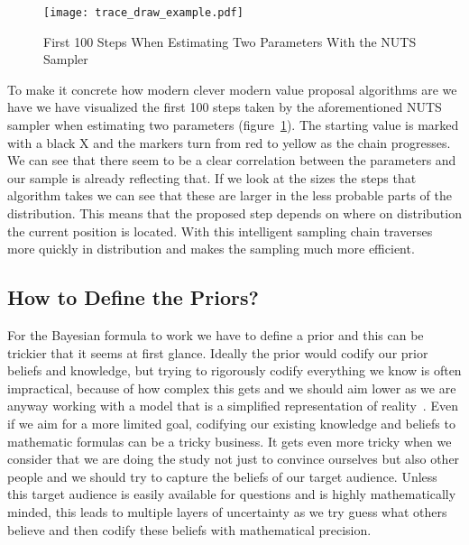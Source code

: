 \documentclass[12pt,a4paper,leqno]{report}
\theoremstyle{plain}
\theoremstyle{definition}
\theoremstyle{remark}
\begin{document}
\begin{figure}[H]
    \centering
    \caption{First 100 Steps When Estimating Two Parameters With the NUTS Sampler}\label{traceexample}
    \texttt{[image: trace\_draw\_example.pdf]}
\end{figure}

To make it concrete how modern clever modern value proposal algorithms are we
have we have visualized the first 100 steps taken by the aforementioned NUTS sampler
when estimating two parameters (figure\ \ref{traceexample}). The starting value is
marked with a black X and the markers turn from red to yellow as the chain progresses.
We can see that there seem to be a clear correlation between the parameters and our
sample is already reflecting that. If we look at the sizes the steps that algorithm
takes we can see that these are larger in the less probable parts of the distribution.
This means that the proposed step depends on where on distribution the current position
is located. With this intelligent sampling chain traverses more
quickly in distribution and makes the sampling much more efficient.

\subsection{How to Define the Priors?}\label{bayesproblems}

For the Bayesian formula to work we have to define a prior and this can be
trickier that it seems at first glance. Ideally the prior would codify our prior
beliefs and knowledge, but trying to rigorously codify everything we
know is often impractical, because of how complex this gets and we should aim lower as we are
anyway working with a model that is a simplified representation of reality\ \cite{gelman}. Even if
we aim for a more limited goal, codifying our existing knowledge and beliefs
to mathematic formulas can be a tricky business. It gets even more
tricky when we consider that we are doing the study not just to convince ourselves
but also other people and we should try to capture the beliefs of our target audience.
Unless this target audience is easily available for questions and is highly mathematically minded,
this leads to multiple layers of uncertainty as we try guess what others
believe and then codify these beliefs with mathematical precision.
\end{document}
